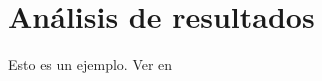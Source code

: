 \chapter{Análisis de resultados}
\label{cap:resultados_obtenidos}

Esto es un ejemplo. Ver en  \cite{simo2015sharing}